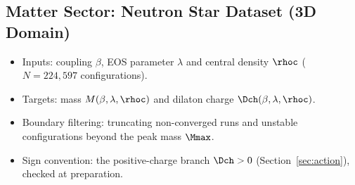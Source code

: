 \subsection{Matter Sector: Neutron Star Dataset (3D Domain)}
\label{sec:neutron-stars}

\begin{itemize}
  \item Inputs: coupling $\beta$, EOS parameter $\lambda$ and central density $\rhoc$ ($N = 224{,}597$ configurations).
  \item Targets: mass $M(\beta, \lambda, \rhoc)$ and dilaton charge $\Dch(\beta, \lambda, \rhoc)$.
  \item Boundary filtering: truncating non-converged runs and unstable configurations beyond the peak mass $\Mmax$.
  \item Sign convention: the positive-charge branch $\Dch > 0$ (Section~\ref{sec:action}), checked at preparation.
\end{itemize}
